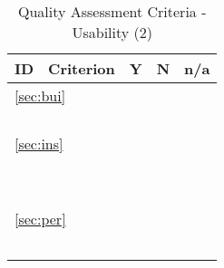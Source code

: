 \documentclass[a4paper,11pt]{article}
\begin{document}
\begin{table}[hbt]
	\begin{tabular}
		{ p{} | 
			p{} |
			p{} |
			p{} |
			p{} }
		\hline
		\textbf{ID} & \textbf{Criterion} & \textbf{Y} & \textbf{N} & \textbf{n/a} \\
        \hline
        \multicolumn{5}{l}{\ref{sec:bui}{ }\nameref{sec:bui}} \\
		\hline
		\hyperref[id:b1]{\bOneID} & \bOneText & & & \\
		\hyperref[id:b2]{\bTwoID} & \bTwoText & & & \\
		\hyperref[id:b3]{\bThreeID} & \bThreeText & & & \\
		\hyperref[id:b4]{\bFourID} & \bFourText & & & \\
		\hline			
		\multicolumn{5}{l}{\ref{sec:ins}{ }\nameref{sec:ins}} \\
		\hline
		\hyperref[id:is1]{\isOneID} & \isOneText & & & \\
		\hyperref[id:is2]{\isTwoID} & \isTwoText & & & \\
		\hyperref[id:is3]{\isThreeID} & \isThreeText & & & \\
		\hyperref[id:is4]{\isFourID} & \isFourText & & & \\
		\hyperref[id:is5]{\isFiveID} & \isFiveText & & & \\
		\hyperref[id:is6]{\isSixID} & \isSixText & & & \\
		\hyperref[id:is7]{\isSevenID} & \isSevenText & & & \\
		\hyperref[id:is8]{\isEightID} & \isEightText & & & \\
		\hyperref[id:is9]{\isNineID} & \isNineText & & & \\
		\hline
		\multicolumn{5}{l}{\ref{sec:per}{ }\nameref{sec:per}} \\
		\hline	
		\hyperref[id:pf1]{\pfOneID} & \pfOneText & & & \\
		\hyperref[id:pf2]{\pfTwoID} & \pfTwoText & & & \\
		\hyperref[id:pf3]{\pfThreeID} & \pfThreeText & & & \\
		\hyperref[id:pf4]{\pfFourID} & \pfFourText & & & \\
		\hyperref[id:pf5]{\pfFiveID} & \pfFiveText & & & \\
		\hline		
		\end{tabular}
		\caption{Quality Assessment Criteria - Usability (2)}
		\label{tab:criteriaUsab2}
\end{table}
\end{document}
